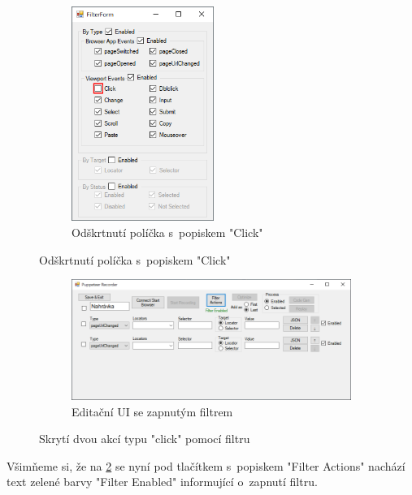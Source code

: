 \documentclass[12pt, a4paper, twoside]{article}
\begin{document}
	\begin{figure}[H]
		\centering
		\begin{subfigure}[t]{1.0\textwidth}
			\centering
			\includegraphics[width=0.51\textwidth]{filterForm4.png}
			\caption{Odškrtnutí políčka s~popiskem "Click"}
		\end{subfigure}
	\end{figure}
	\vspace{-0.7cm}
	\begin{figure}[H]\ContinuedFloat
		\centering
		\textdownarrow
	\end{figure}
	\vspace{-0.6cm}
	\begin{figure}[H]\ContinuedFloat
		\centering
		\begin{subfigure}[t]{1.0\textwidth}
			\centering
			\includegraphics[width=1.0\textwidth]{filtered.png}
			\caption{Editační UI se zapnutým filtrem}
			\label{subfig:editUiFiltered}
		\end{subfigure}
		\caption{Skrytí dvou akcí typu "click" pomocí filtru}
	\end{figure}
	Všimňeme si, že na \cref{subfig:editUiFiltered} se nyní pod tlačítkem s~popiskem "Filter Actions" nachází text zelené barvy "Filter Enabled" informující o~zapnutí filtru.
\end{document}
